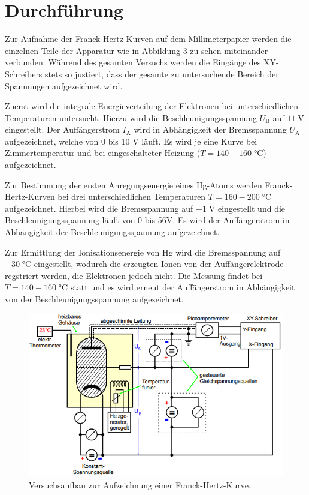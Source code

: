 \section{Durchführung}
\label{sec:Durchführung}
Zur Aufnahme der Franck-Hertz-Kurven auf dem Millimeterpapier werden die einzelnen 
Teile der Apparatur wie in Abbildung 3 zu sehen miteinander verbunden.
Während des gesamten Versuchs werden die Eingänge des XY-Schreibers stets so justiert, 
dass der gesamte zu untersuchende Bereich der Spannungen aufgezeichnet wird.

Zuerst wird die integrale Energieverteilung der Elektronen bei unterschiedlichen Temperaturen
untersucht. Hierzu wird die Beschleunigungsspannung $U_\text{B}$ auf $11\;\si{\volt}$ eingestellt.
Der Auffängerstrom $I_\text{A}$ wird in Abhängigkeit der Bremsspannung $U_\text{A}$
aufgezeichnet, welche von 0 bis 10 V läuft. Es wird je eine Kurve bei Zimmertemperatur und bei
eingeschalteter Heizung ($T = 140-160\;\si{\celsius}$) aufgezeichnet.

Zur Bestimmung der ersten Anregungsenergie eines Hg-Atoms werden Franck-Hertz-Kurven bei drei 
unterschiedlichen Temperaturen $T = 160-200\;\si{\celsius}$ aufgezeichnet. Hierbei
wird die Bremsspannung auf $-1\;\si{\volt}$ eingestellt und die Beschleunigungsspannung
läuft von 0 bis 56\;\si{\volt}. Es wird der Auffängerstrom in Abhängigkeit der Beschleunigungsspannung
aufgezeichnet.

Zur Ermittlung der Ionisationsenergie von Hg wird die Bremsspannung auf $-30\;\si{\celsius}$ eingestellt,
wodurch die erzeugten Ionen von der Auffängerelektrode regstriert werden, die Elektronen jedoch nicht.
Die Messung findet bei $T = 140-160\;\si{\celsius}$ statt und es wird erneut der Auffängerstrom in 
Abhängigkeit von der Beschleunigungsspannung aufgezeichnet.

\begin{figure}[H]
  \centering
  \includegraphics[width=13cm]{durchf.png}
  \caption{Versuchsaufbau zur Aufzeichnung einer Franck-Hertz-Kurve. \cite[S.124]{kent}}
  \label{fig:durchf}
\end{figure}
